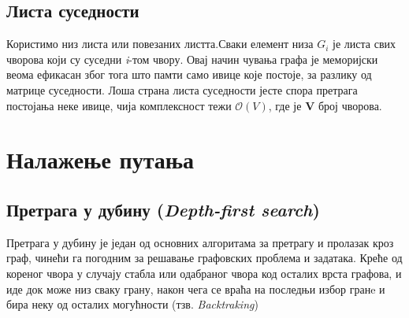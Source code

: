 \documentclass[11pt, oneside, a4paper]{article}
\begin{document}
\subsection*{Листа суседности}
Користимо низ листа или повезаних листта.Сваки елемент низа $G_i$ је листа свих чворова који су суседни \textit{i}-том чвору. Овај начин чувања графа је меморијски веома ефикасан због тога што памти само ивице које постоје, за разлику од матрице суседности. Лоша страна листа суседности јесте спора претрага постојања неке ивице, чија комплексност тежи $\mathcal{O}(V)$, где је \textbf{V} број чворова.

\newpage
\section{Налажење путања}
\subsection{Претрага у дубину (\textit{Depth-first search})}
Претрага у дубину је један од основних алгоритама за претрагу и пролазак кроз граф, чинећи га погодним за решавање графовских проблема и задатака. Креће од кореног чвора у случају стабла или одабраног чвора код осталих врста графова, и иде док може низ сваку	грану, након чега се враћа на последњи избор гранe и бира неку од осталих могућности (тзв. \textit{Backtraking}) 
\end{document}
